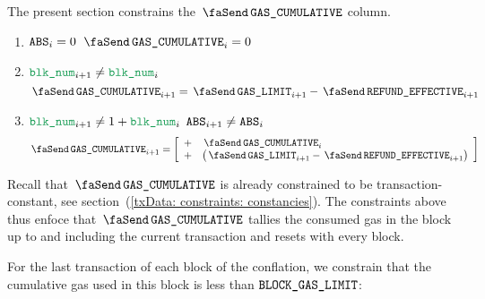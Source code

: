 The present section constrains the $\txCumulativeConsumedGas$ column. 
\begin{enumerate}
	\item \If $\texttt{ABS}_{i} = 0$ \Then $\txCumulativeConsumedGas_{i} = 0$
	\item \If $\locBlock_{i + 1} \neq \locBlock_{i}$ \Then
		\[ \txCumulativeConsumedGas_{i + 1} = \txGasLimit_{i + 1} - \txEffectiveRefund_{i + 1} \]
	\item \If $\locBlock_{i + 1} \neq 1 + \locBlock_{i}$ \et $\texttt{ABS}_{i + 1} \neq \texttt{ABS}_{i}$ \Then
		\[
			\txCumulativeConsumedGas_{i + 1} 
			=
			\left[ \begin{array}{ll}
				+ & \txCumulativeConsumedGas_{i}                           \\
				+ & \big(\txGasLimit_{i + 1} - \txEffectiveRefund_{i + 1}\big) \\
			\end{array}\right]
		\]
\end{enumerate}
Recall that $\txCumulativeConsumedGas$ is already constrained to be transaction-constant, see section~(\ref{txData: constraints: constancies}).
The constraints above thus enfoce that $\txCumulativeConsumedGas$ tallies the consumed gas in the block up to and including the current transaction and resets with every block.

For the last transaction of each block of the conflation, we constrain that the cumulative gas used in this block is less than $\texttt{BLOCK\_GAS\_LIMIT}$:

